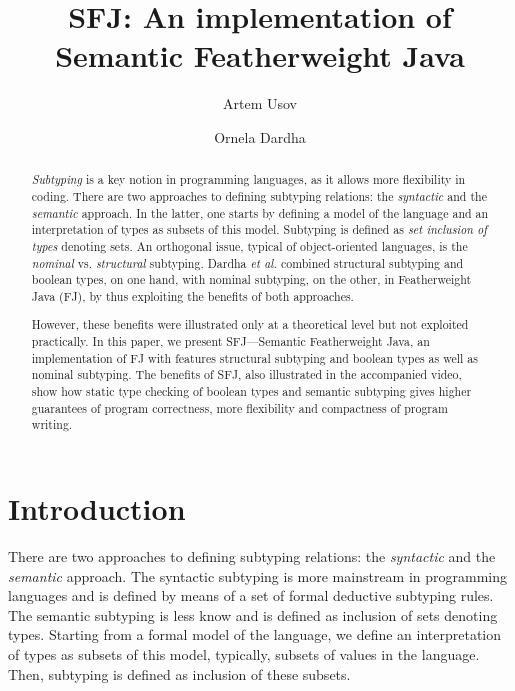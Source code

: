 \documentclass[runningheads]{llncs}
\begin{document}
\title{SFJ: An implementation of Semantic Featherweight Java
}

\author{Artem Usov \and Ornela Dardha}


\maketitle

\begin{abstract}
\emph{Subtyping} is a key notion in programming languages, as it allows more flexibility in coding.
There are two approaches to defining subtyping relations: the \emph{syntactic} and the \emph{semantic} approach.
In the latter, one starts by defining a model of the language and an interpretation of types as subsets of this model.
Subtyping is defined as \emph{set inclusion of types} denoting sets.
An orthogonal issue, typical of object-oriented languages, is the \emph{nominal} vs. \emph{structural} subtyping.
Dardha \emph{et al.} \cite{Dardha2013,Dardha2017} combined structural subtyping and boolean types, on one hand, with nominal subtyping, on the other, in Featherweight Java (FJ), by thus exploiting the benefits of both approaches.

However, these benefits were illustrated only at a theoretical level but not exploited practically.
In this paper, we present SFJ---Semantic Featherweight Java, an implementation of FJ with features structural subtyping and boolean types as well as nominal subtyping.
The benefits of SFJ, also illustrated in the accompanied video, show how static type checking of boolean types and semantic subtyping gives higher guarantees of program correctness, more flexibility and compactness of program writing.
\end{abstract}


\section{Introduction}
There are two approaches to defining subtyping relations: the \emph{syntactic} and the \emph{semantic} approach.
The syntactic subtyping is more mainstream in programming languages and is defined by means of a set of formal deductive subtyping rules.
The semantic subtyping is less know and is defined as inclusion of sets denoting types. Starting from a formal model of the  language, we define an interpretation of types as subsets of this model, typically, subsets of values in the language. Then, subtyping is defined as inclusion of these subsets.
\end{document}
